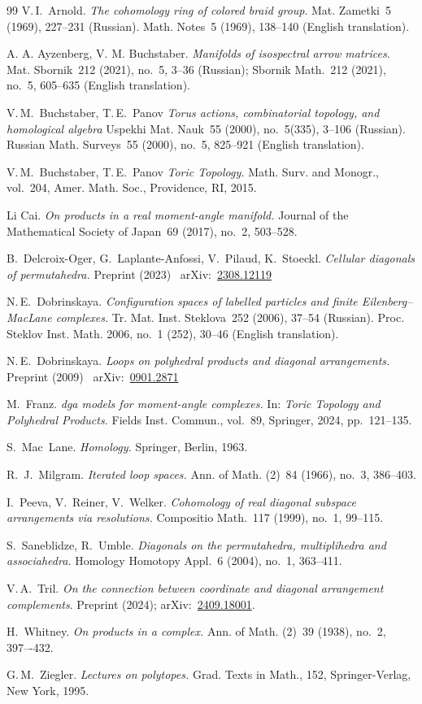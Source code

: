 \documentclass[a4paper,12pt]{amsart}
\theoremstyle{definition}
\theoremstyle{remark}
\numberwithin{equation}{section}
\begin{document}
\begin{thebibliography}{99}
V.\,I.~Arnold.
\emph{The cohomology ring of colored braid group}.
Mat. Zametki~5 (1969), 227--231 (Russian).
Math. Notes~5 (1969), 138--140 (English translation).

A. A. Ayzenberg, V. M. Buchstaber. 
\emph{Manifolds of isospectral arrow matrices}.
Mat. Sbornik~212 (2021), no.~5, 3--36 (Russian);
Sbornik Math.~212 (2021), no.~5, 605--635 (English translation).

V.\,M.~Buchstaber, T.\,E.~Panov
\emph{Torus actions, combinatorial topology, and homological algebra}
Uspekhi Mat. Nauk~55 (2000), no.~5(335), 3--106 (Russian).
Russian Math. Surveys~55 (2000), no.~5, 825--921 (English translation). 

V.\,M.~Buchstaber, T.\,E.~Panov
\emph{Toric Topology.}
Math. Surv. and Monogr., vol.~204,  Amer. Math. Soc., Providence, RI, 2015.

Li Cai.
\emph{On products in a real moment-angle manifold.}
Journal of the Mathematical Society of Japan~69 (2017), no.~2, 503--528.

B.~Delcroix-Oger, G.~Laplante-Anfossi, V.~Pilaud, K.~Stoeckl.
\emph{Cellular diagonals of permutahedra.} Preprint (2023) \
arXiv:~\href{https://arxiv.org/abs/2308.12119}{2308.12119}

N.\,E.~Dobrinskaya.
\emph{Configuration spaces of labelled particles and finite Eilenberg--MacLane complexes.}
Tr. Mat. Inst. Steklova~252 (2006), 37--54 (Russian).
Proc. Steklov Inst. Math. 2006, no.~1 (252), 30--46 (English translation).

N.\,E.~Dobrinskaya.
\emph{Loops on polyhedral products and diagonal arrangements.}
Preprint (2009) \ arXiv:~\href{https://arxiv.org/abs/0901.2871}{0901.2871}

M.~Franz.
\emph{dga models for moment-angle complexes.}
In: \emph{Toric Topology and Polyhedral Products.} Fields Inst. Commun., vol.~89, Springer, 2024, pp.~121--135.

S.~Mac~Lane. \emph{Homology.}
Springer, Berlin, 1963.

R.~J.~Milgram.
\emph{Iterated loop spaces.}
Ann. of Math. (2)~84 (1966), no.~3, 386--403.

I.~Peeva, V.~Reiner, V.~Welker.
\emph{Cohomology of real diagonal subspace arrangements via resolutions.}
Compositio Math.~117 (1999), no.~1, 99--115.

S.~Saneblidze, R.~Umble.
\emph{Diagonals on the permutahedra, multiplihedra and associahedra.}
Homology Homotopy Appl.~6 (2004), no.~1, 363--411.

V.\,A.~Tril.
\emph{On the connection between coordinate and diagonal arrangement complements}.
Preprint (2024); arXiv:~\href{https://arxiv.org/abs/2409.18001}{2409.18001}.

H.~Whitney.
\emph{On products in a complex.}
Ann. of Math. (2)~39 (1938), no.~2, 397–-432.

G.\,M.~Ziegler.
\emph{Lectures on polytopes.}
Grad. Texts in Math., 152,
Springer-Verlag, New York, 1995.
\end{thebibliography}
\end{document}
